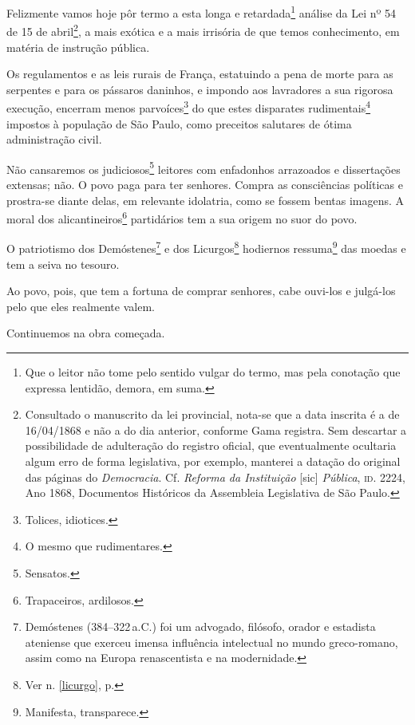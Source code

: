 Felizmente vamos hoje pôr termo a esta longa e retardada\footnote{Que
  o leitor não tome pelo sentido vulgar do termo, mas pela conotação que
  expressa lentidão, demora, em suma.} análise da Lei nº 54 de 15 de
abril\footnote{Consultado o manuscrito da lei provincial, nota-se que
  a data inscrita é a de 16/04/1868 e não a do dia anterior, conforme
  Gama registra. Sem descartar a possibilidade de adulteração do
  registro oficial, que eventualmente ocultaria algum erro de forma
  legislativa, por exemplo, manterei a datação do original das páginas
  do \emph{Democracia}. Cf. \emph{Reforma da Instituição} {[}sic{]}
  \emph{Pública}, \textsc{id}. 2224, Ano 1868, Documentos Históricos da
  Assembleia Legislativa de São Paulo.}, a mais exótica e a mais
irrisória de que temos conhecimento, em matéria de instrução pública.

Os regulamentos e as leis rurais de França, estatuindo a pena de morte
para as serpentes e para os pássaros daninhos, e impondo aos lavradores
a sua rigorosa execução, encerram menos parvoíces\footnote{Tolices,
  idiotices.} do que estes disparates rudimentais\footnote{O mesmo que
  rudimentares.} impostos à população de São Paulo, como preceitos
salutares de ótima administração civil.

Não cansaremos os judiciosos\footnote{Sensatos.} leitores com
enfadonhos arrazoados e dissertações extensas; não. O povo paga para ter
senhores. Compra as consciências políticas e prostra-se diante delas, em
relevante idolatria, como se fossem bentas imagens. A moral dos
alicantineiros\footnote{Trapaceiros, ardilosos.} partidários tem a sua
origem no suor do povo.

O patriotismo dos Demóstenes\footnote{Demóstenes (384--322\,a.C.)
  foi um advogado, filósofo, orador e estadista ateniense que exerceu
  imensa influência intelectual no mundo greco-romano, assim como na
  Europa renascentista e na modernidade.} e dos Licurgos\footnote{Ver n. 
  \ref{licurgo}, p. \pageref{licurgo}} hodiernos ressuma\footnote{Manifesta, 
  transparece.} das moedas e tem a seiva no tesouro.

Ao povo, pois, que tem a fortuna de comprar senhores, cabe ouvi-los e
julgá-los pelo que eles realmente valem.

Continuemos na obra começada.

